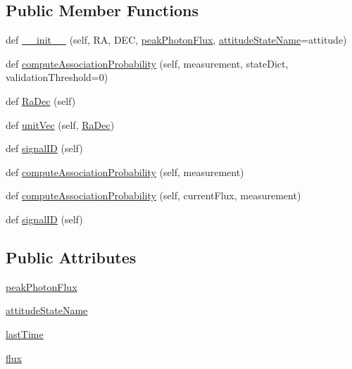 \subsection*{Public Member Functions}
\begin{DoxyCompactItemize}
\item 
def \hyperlink{classmodest_1_1signals_1_1xraysource_1_1StaticXRayPointSource_abf7bfb177879d4c923da7fbd3d20070e}{\+\_\+\+\_\+init\+\_\+\+\_\+} (self, RA, D\+EC, \hyperlink{classmodest_1_1signals_1_1xraysource_1_1StaticXRayPointSource_a45c2430decc163480da7732af27d1f99}{peak\+Photon\+Flux}, \hyperlink{classmodest_1_1signals_1_1pointsource_1_1PointSource_a0924a2233bb4fd23e50d024e4f1b048e}{attitude\+State\+Name}=\textquotesingle{}attitude\textquotesingle{})
\item 
def \hyperlink{classmodest_1_1signals_1_1xraysource_1_1StaticXRayPointSource_acc2579a19ffce3dffd4dda4ddc66c265}{compute\+Association\+Probability} (self, measurement, state\+Dict, validation\+Threshold=0)
\item 
def \hyperlink{classmodest_1_1signals_1_1pointsource_1_1PointSource_a295eb1a487e18c77029585ac2785db80}{Ra\+Dec} (self)
\item 
def \hyperlink{classmodest_1_1signals_1_1pointsource_1_1PointSource_aa51308fcb654e7183d332ed824965397}{unit\+Vec} (self, \hyperlink{classmodest_1_1signals_1_1pointsource_1_1PointSource_a295eb1a487e18c77029585ac2785db80}{Ra\+Dec})
\item 
def \hyperlink{classmodest_1_1signals_1_1signalsource_1_1SignalSource_a9a64c6a9c2954f6ad61e4ca3518ea8ab}{signal\+ID} (self)
\item 
def \hyperlink{classmodest_1_1signals_1_1poissonsource_1_1StaticPoissonSource_a1754d94bff46d97817438bab552afef9}{compute\+Association\+Probability} (self, measurement)
\item 
def \hyperlink{classmodest_1_1signals_1_1poissonsource_1_1PoissonSource_a2f8a73e6f51cbdcd0f1e646d6f4d4574}{compute\+Association\+Probability} (self, current\+Flux, measurement)
\item 
def \hyperlink{classmodest_1_1signals_1_1signalsource_1_1SignalSource_a9a64c6a9c2954f6ad61e4ca3518ea8ab}{signal\+ID} (self)
\end{DoxyCompactItemize}
\subsection*{Public Attributes}
\begin{DoxyCompactItemize}
\item 
\hyperlink{classmodest_1_1signals_1_1xraysource_1_1StaticXRayPointSource_a45c2430decc163480da7732af27d1f99}{peak\+Photon\+Flux}
\item 
\hyperlink{classmodest_1_1signals_1_1pointsource_1_1PointSource_a0924a2233bb4fd23e50d024e4f1b048e}{attitude\+State\+Name}
\item 
\hyperlink{classmodest_1_1signals_1_1poissonsource_1_1PoissonSource_a34395fc83bd8743a0a5ee69f9392a606}{last\+Time}
\item 
\hyperlink{classmodest_1_1signals_1_1poissonsource_1_1PoissonSource_a6f2c657ad936b921715d826ac74f7fe5}{flux}
\end{DoxyCompactItemize}
